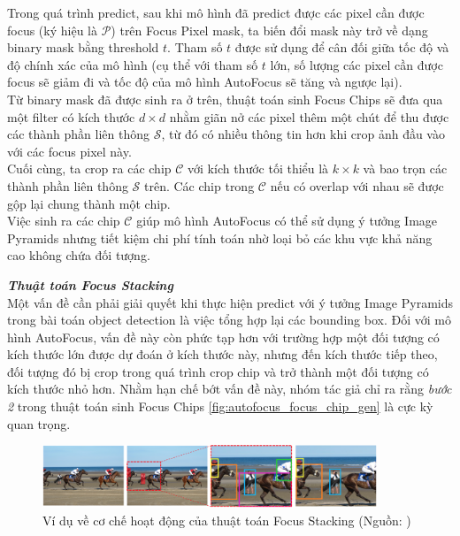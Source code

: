 {    \noindent
    Trong quá trình predict, sau khi mô hình đã predict được các pixel cần được focus (ký hiệu là $\mathcal{P}$) trên Focus Pixel mask, ta biến đổi mask này trở về dạng binary mask bằng threshold $t$.
    Tham số $t$ được sử dụng để cân đối giữa tốc độ và độ chính xác của mô hình (cụ thể với tham số $t$ lớn, số lượng các pixel cần được focus sẽ giảm đi và tốc độ của mô hình AutoFocus sẽ tăng và ngược lại). \\
    Từ binary mask đã được sinh ra ở trên, thuật toán sinh Focus Chips sẽ đưa qua một filter có kích thước $d \times d$ nhằm giãn nở các pixel thêm một chút để thu được các thành phần liên thông $\mathcal{S}$, từ đó có nhiều thông tin hơn khi crop ảnh đầu vào với các focus pixel này. \\
    Cuối cùng, ta crop ra các chip $\mathcal{C}$ với kích thước tối thiểu là $k \times k$ và bao trọn các thành phần liên thông $\mathcal{S}$ trên.
    Các chip trong $\mathcal{C}$ nếu có overlap với nhau sẽ được gộp lại chung thành một chip. \\
    Việc sinh ra các chip $\mathcal{C}$ giúp mô hình AutoFocus có thể sử dụng ý tưởng Image Pyramids nhưng tiết kiệm chi phí tính toán nhờ loại bỏ các khu vực khả năng cao không chứa đối tượng.

    \noindent
    \textbf{\textit{Thuật toán Focus Stacking}} \\
    Một vấn đề cần phải giải quyết khi thực hiện predict với ý tưởng Image Pyramids trong bài toán object detection là việc tổng hợp lại các bounding box.
    Đối với mô hình AutoFocus, vấn đề này còn phức tạp hơn với trường hợp một đối tượng có kích thước lớn được dự đoán ở kích thước này, nhưng đến kích thước tiếp theo, đối tượng đó bị crop trong quá trình crop chip và trở thành một đối tượng có kích thước nhỏ hơn.
    Nhằm hạn chế bớt vấn đề này, nhóm tác giả chỉ ra rằng \textit{bước 2} trong thuật toán sinh Focus Chips \ref{fig:autofocus_focus_chip_gen} là cực kỳ quan trọng.

    \begin{figure}[H]
        \centering
        \includegraphics[width=10cm] {images/autofocus_focus_stack}
        \caption{Ví dụ về cơ chế hoạt động của thuật toán Focus Stacking (Nguồn: \cite{najibi2019autofocus})}
        \label{fig:autofocus_focus_stack}
    \end{figure}

}
